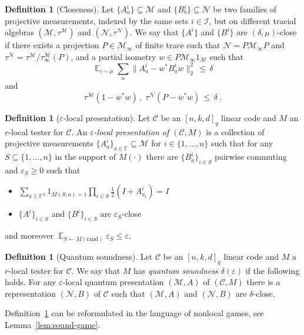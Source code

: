 \documentclass[11pt]{article}
\theoremstyle{definition}
\newtheorem{definition}[theorem]{Definition}
\newcommand{\code}{\mathcal{C}}
\newcommand{\Id}{\ensuremath{I}}
\DeclareMathOperator*{\Expectation}{\mathbb{E}}
\newcommand{\Es}[1]{\Expectation_{#1}}
\newcommand{\field}{\mathbb{F}}
\newcommand{\F}{\ensuremath{\mathbb{F}}}
\newcommand{\mM}{\ensuremath{\mathcal{M}}}
\newcommand{\mI}{\ensuremath{\mathcal{I}}}
\newcommand{\rand}{\textrm{rand}}
\newcommand{\eps}{\varepsilon}
\newcommand{\mN}{\mathcal{N}}
\begin{document}
\begin{definition}[Closeness]\label{def:close}
Let $\{A^i_a\}\subseteq \mM$ and $\{B^i_b\}\subseteq \mN$ be two families of projective measurements, indexed by the same sets $i\in \mI$, but on different tracial algebras $(\mM,\tau^\mM)$ and $(\mN,\tau^\mN)$. We say that $\{A^i\}$ and $\{B^i\}$ are $(\delta,\mu)$-close if there exists a projection $P\in\mM_\infty$ of finite trace such that $\mN=P\mM_\infty P$ and $\tau^\mN=\tau^\mM/\tau^\mM_\infty(P)$, and a partial isometry $w\in P \mM_\infty 1_\mM$ such that 
\[ \Es{i\sim\mu} \sum_a \big\| A^i_a - w^* B^i_a w \big\|_2^2 \,\leq\,\delta\]
and 
\[ \tau^\mM(1-w^*w)\,,\; \tau^\mN(P-w^*w) \,\leq\, \delta\;.\]
\end{definition}

\begin{definition}[$\eps$-local presentation]
Let $\code$ be an $[n,k,d]_q$ linear code and $M$ an $r$-local tester for $\code$. An \emph{$\eps$-local presentation of $(\code,M)$} is a collection of projective measurements $\{A^i_a\}_{a\in\field} \subseteq\mM$ for $i\in\{1,\ldots,n\}$ such that for any $S\subseteq\{1,\ldots,n\}$ in the support of $M(\cdot)$ there are $\{B^i_a\}_{i\in S}$ pairwise commuting and $\eps_S\geq 0$ such that 
\begin{itemize}
\item $\sum_{a\in \F^S} 1_{M(S,a)=1} \prod_{i\in S} \frac{1}{2}(\Id+A^i_{a_i})= \Id$
\item $\{A^i\}_{i\in S}$ and $\{B^i\}_{i\in S}$ are $\eps_S$-close
\end{itemize} 
and moreover $\Es{S\leftarrow M(\rand)} \eps_S \leq \eps$. 
\end{definition}


\begin{definition}[Quantum soundness]\label{def:q-sound}
Let $\code$ be an $[n,k,d]_q$ linear code and $M$ a $r$-local tester for $\code$. We say that $M$ has \emph{quantum soundness $\delta(\eps)$} if the following holds. For any $\eps$-local quantum presentation $(\mM,A)$ of $(\code,M)$
there is a representation $(\mN,B)$ of $\code$ such that $(\mM,A)$ and $(\mN,B)$ are $\delta$-close. 
\end{definition}

Definition~\ref{def:q-sound} can be reformulated in the language of nonlocal games, see Lemma~\ref{lem:sound-game}. 
\end{document}
